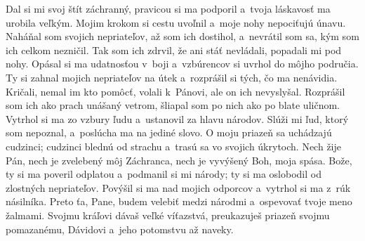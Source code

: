 Dal si mi svoj štít záchranný,
pravicou si ma podporil
a~tvoja láskavosť ma urobila veľkým.
\versseparator
Mojim krokom si cestu uvoľnil
a~moje nohy nepociťujú únavu.
\versseparator
Naháňal som svojich nepriateľov, až som ich dostihol,
a~nevrátil som sa, kým som ich celkom nezničil.
\versseparator
Tak som ich zdrvil, že ani stáť nevládali,
popadali mi pod nohy.
\versseparator
Opásal si ma udatnosťou v~boji
a~vzbúrencov si uvrhol do môjho područia.
\versseparator
Ty si zahnal mojich nepriateľov na útek
a~rozprášil si tých, čo ma nenávidia.
\versseparator
Kričali, nemal im kto pomôcť,
volali k~Pánovi, ale on ich nevyslyšal.
\versseparator
Rozprášil som ich ako prach unášaný vetrom,
šliapal som po nich ako po blate uličnom.
\versseparator
Vytrhol si ma zo vzbury ľudu
a~ustanovil za hlavu národov.
\versseparator
Slúži mi ľud, ktorý som nepoznal,
a~poslúcha ma na jediné slovo.
\versseparator
O moju priazeň sa uchádzajú cudzinci;
cudzinci blednú od strachu
a~trasú sa vo svojich úkrytoch.
\versseparator
Nech žije Pán, nech je zvelebený môj Záchranca,
nech je vyvýšený Boh, moja spása.
\versseparator
Bože, ty si ma poveril odplatou
a~podmanil si mi národy;
ty si ma oslobodil od zlostných nepriateľov.
\versseparator
Povýšil si ma nad mojich odporcov
a~vytrhol si ma z~rúk násilníka.
\versseparator
Preto ťa, Pane, budem velebiť medzi národmi
a~ospevovať tvoje meno žalmami.
\versseparator
Svojmu kráľovi dávaš veľké víťazstvá,
preukazuješ priazeň svojmu pomazanému,
Dávidovi a~jeho potomstvu až naveky.
